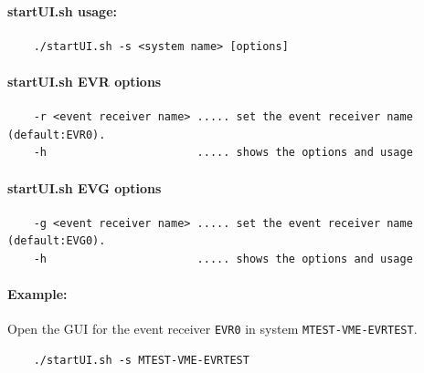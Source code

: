 \documentclass[12pt,a4paper]{article}
\begin{document}
\paragraph{startUI.sh usage:}
\begin{verbatim}
	./startUI.sh -s <system name> [options]
\end{verbatim}


\paragraph{startUI.sh EVR options}
\begin{verbatim}
	-r <event receiver name> ..... set the event receiver name (default:EVR0).
	-h                       ..... shows the options and usage
\end{verbatim}

\paragraph{startUI.sh EVG options}
\begin{verbatim}
	-g <event receiver name> ..... set the event receiver name (default:EVG0).
	-h                       ..... shows the options and usage
\end{verbatim}

\paragraph{Example:} Open the GUI for the event receiver \texttt{EVR0} in system \texttt{MTEST-VME-EVRTEST}.
\begin{verbatim}
	./startUI.sh -s MTEST-VME-EVRTEST
\end{verbatim}




\end{document}
